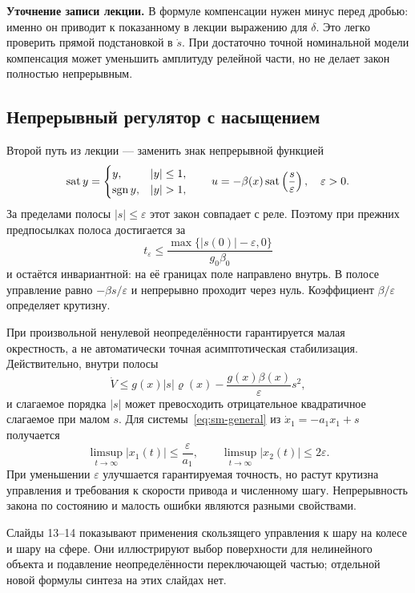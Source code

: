 \textbf{Уточнение записи лекции.} В формуле компенсации нужен минус перед
дробью: именно он приводит к показанному в лекции выражению для $\delta$.
Это легко проверить прямой подстановкой в $\dot s$.
При достаточно точной номинальной модели компенсация может уменьшить
амплитуду релейной части,
но не делает закон полностью непрерывным.

\subsection{Непрерывный регулятор с насыщением}

Второй путь из лекции --- заменить знак непрерывной функцией
\[
 \sat y=\begin{cases}y,&|y|\le1,\\\sgn y,&|y|>1,\end{cases}
 \qquad
 u=-\beta(x)\sat\left(\frac{s}{\varepsilon}\right),\quad\varepsilon>0.
\]
За пределами полосы $|s|\le\varepsilon$ этот закон совпадает с реле.
Поэтому при прежних предпосылках полоса достигается за
\[
 t_\varepsilon\le
 \frac{\max\{|s(0)|-\varepsilon,0\}}{g_0\beta_0}
\]
и остаётся инвариантной: на её границах поле направлено внутрь.
В полосе управление равно $-\beta s/\varepsilon$ и непрерывно проходит
через нуль. Коэффициент $\beta/\varepsilon$ определяет крутизну.

\addition При произвольной ненулевой неопределённости гарантируется малая
окрестность, а не автоматически точная асимптотическая стабилизация.
Действительно, внутри полосы
\[
 \dot V\le g(x)|s|\varrho(x)-\frac{g(x)\beta(x)}{\varepsilon}s^2,
\]
и слагаемое порядка $|s|$ может превосходить отрицательное квадратичное
слагаемое при малом $s$. Для системы~\eqref{eq:sm-general} из
$\dot x_1=-a_1x_1+s$ получается
\[
 \limsup_{t\to\infty}|x_1(t)|\le\frac{\varepsilon}{a_1},\qquad
 \limsup_{t\to\infty}|x_2(t)|\le2\varepsilon.
\]
При уменьшении $\varepsilon$ улучшается гарантируемая точность, но растут
крутизна управления и требования к скорости привода и численному шагу.
Непрерывность закона по состоянию и малость ошибки являются разными свойствами.

Слайды 13--14 показывают применения скользящего управления к шару на колесе
и шару на сфере. Они иллюстрируют выбор поверхности для нелинейного объекта
и подавление неопределённости переключающей частью; отдельной новой формулы
синтеза на этих слайдах нет.

